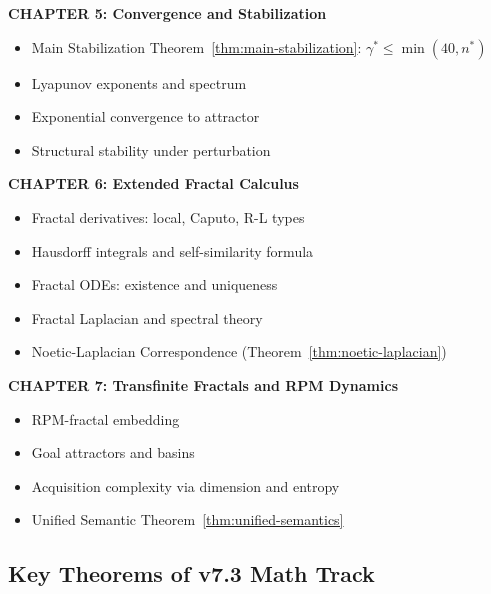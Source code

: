 \begin{tcolorbox}[colback=green!5!white,colframe=green!75!black,title=\textbf{TKS v7.3 Math Track: Complete Summary},breakable]
\textbf{CHAPTER 5: Convergence and Stabilization}
\begin{itemize}
  \item Main Stabilization Theorem~\ref{thm:main-stabilization}: $\gamma^* \leq \min(40, n^*)$
  \item Lyapunov exponents and spectrum
  \item Exponential convergence to attractor
  \item Structural stability under perturbation
\end{itemize}

\textbf{CHAPTER 6: Extended Fractal Calculus}
\begin{itemize}
  \item Fractal derivatives: local, Caputo, R-L types
  \item Hausdorff integrals and self-similarity formula
  \item Fractal ODEs: existence and uniqueness
  \item Fractal Laplacian and spectral theory
  \item Noetic-Laplacian Correspondence (Theorem~\ref{thm:noetic-laplacian})
\end{itemize}

\textbf{CHAPTER 7: Transfinite Fractals and RPM Dynamics}
\begin{itemize}
  \item RPM-fractal embedding
  \item Goal attractors and basins
  \item Acquisition complexity via dimension and entropy
  \item Unified Semantic Theorem~\ref{thm:unified-semantics}
\end{itemize}

\end{tcolorbox}

\subsection{Key Theorems of v7.3 Math Track}

